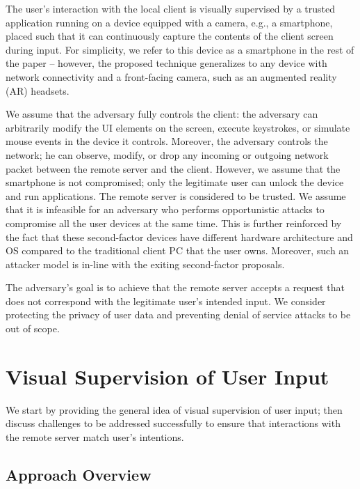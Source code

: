 The user's interaction with the local client is visually supervised by a trusted application running on a device equipped with a camera, e.g., a smartphone, placed such that it can continuously capture the contents of the client screen during input.
For simplicity, we refer to this device as a smartphone in the rest of the paper -- however, the proposed technique generalizes to any device with network connectivity and a front-facing camera, such as an augmented reality (AR) headsets. %


We assume that the adversary fully controls the client: the adversary can arbitrarily modify the UI elements on the screen, execute keystrokes, or simulate mouse events in the device it controls. Moreover, the adversary controls the network; he can observe, modify, or drop any incoming or outgoing network packet between the remote server and the client.
However, we assume that the smartphone is not compromised; only the legitimate user can unlock the device and run applications. The remote server is considered to be trusted. %
We assume that it is infeasible for an adversary who performs opportunistic attacks to compromise all the user devices at the same time. This is further reinforced by the fact that these second-factor devices have different hardware architecture and OS compared to the traditional client PC that the user owns.
Moreover, such an attacker model is in-line with the exiting second-factor proposals.


The adversary's goal is to achieve that the remote server accepts a request that does not correspond with the legitimate user's intended input.
We consider protecting the privacy of user data and preventing denial of service attacks to be out of scope.


\section{Visual Supervision of User Input}
\label{sec:systemDesign}

We start by providing the general idea of visual supervision of user input; then discuss challenges to be addressed successfully to ensure that interactions with the remote server match user's intentions.


\subsection{Approach Overview}
\label{sec:systemDesign:overallApproach}


